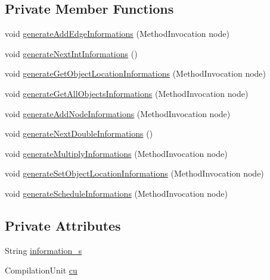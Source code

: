 \subsection*{Private Member Functions}
\begin{DoxyCompactItemize}
\item 
void \hyperlink{classit_1_1isislab_1_1masonhelperdocumentation_1_1visitor_1_1_step_method_visitor_a0adcfbbf2e77a8db79f0b7cc7ca9d8f9}{generate\-Add\-Edge\-Informations} (Method\-Invocation node)
\item 
void \hyperlink{classit_1_1isislab_1_1masonhelperdocumentation_1_1visitor_1_1_step_method_visitor_a758d01aa81334cc175ea359d26502452}{generate\-Next\-Int\-Informations} ()
\item 
void \hyperlink{classit_1_1isislab_1_1masonhelperdocumentation_1_1visitor_1_1_step_method_visitor_a8c409c2d6cf5d87e5fdfbd8e5be90953}{generate\-Get\-Object\-Location\-Informations} (Method\-Invocation node)
\item 
void \hyperlink{classit_1_1isislab_1_1masonhelperdocumentation_1_1visitor_1_1_step_method_visitor_aaa265bf4266e6eddf5d62a5285239cf9}{generate\-Get\-All\-Objects\-Informations} (Method\-Invocation node)
\item 
void \hyperlink{classit_1_1isislab_1_1masonhelperdocumentation_1_1visitor_1_1_step_method_visitor_af1e379d214cb15623eab1e7dcdcf7526}{generate\-Add\-Node\-Informations} (Method\-Invocation node)
\item 
void \hyperlink{classit_1_1isislab_1_1masonhelperdocumentation_1_1visitor_1_1_step_method_visitor_a095db5d1d6d5551de2250d5ab6e770eb}{generate\-Next\-Double\-Informations} ()
\item 
void \hyperlink{classit_1_1isislab_1_1masonhelperdocumentation_1_1visitor_1_1_step_method_visitor_ae1d8e9d0a38e8ffbff89b0b40b7a562b}{generate\-Multiply\-Informations} (Method\-Invocation node)
\item 
void \hyperlink{classit_1_1isislab_1_1masonhelperdocumentation_1_1visitor_1_1_step_method_visitor_a6da0e3fe57c639de2c827068e2e57efc}{generate\-Set\-Object\-Location\-Informations} (Method\-Invocation node)
\item 
void \hyperlink{classit_1_1isislab_1_1masonhelperdocumentation_1_1visitor_1_1_step_method_visitor_aecf5552414bc7ba6913a5e026c6048cd}{generate\-Schedule\-Informations} (Method\-Invocation node)
\end{DoxyCompactItemize}
\subsection*{Private Attributes}
\begin{DoxyCompactItemize}
\item 
String \hyperlink{classit_1_1isislab_1_1masonhelperdocumentation_1_1visitor_1_1_step_method_visitor_adf58f8f5068e330783c3c4bd78080f1a}{information\-\_\-s}
\item 
Compilation\-Unit \hyperlink{classit_1_1isislab_1_1masonhelperdocumentation_1_1visitor_1_1_step_method_visitor_a2e892060825ccd1ba2382eb96b6d187a}{cu}
\end{DoxyCompactItemize}

